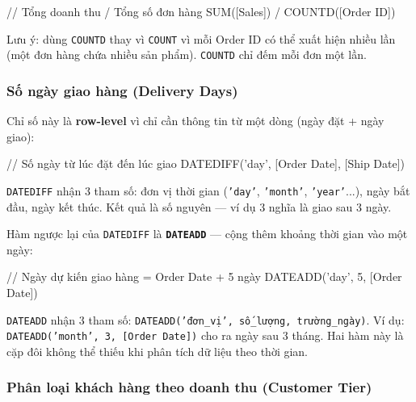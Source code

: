 \documentclass[12pt]{article}
\begin{document}
\begin{aivncodebox}[]
\begin{python}
// Tổng doanh thu / Tổng số đơn hàng
SUM([Sales]) / COUNTD([Order ID])
\end{python}
\end{aivncodebox}

\noindent Lưu ý: dùng \texttt{COUNTD} thay vì \texttt{COUNT} vì mỗi Order ID có thể xuất hiện nhiều lần (một đơn hàng chứa nhiều sản phẩm). \texttt{COUNTD} chỉ đếm mỗi đơn một lần.

\subsubsection{Số ngày giao hàng (Delivery Days)}

\noindent Chỉ số này là \textbf{row-level} vì chỉ cần thông tin từ một dòng (ngày đặt + ngày giao):

\begin{aivncodebox}[]
\begin{python}
// Số ngày từ lúc đặt đến lúc giao
DATEDIFF('day', [Order Date], [Ship Date])
\end{python}
\end{aivncodebox}

\noindent \texttt{DATEDIFF} nhận 3 tham số: đơn vị thời gian (\texttt{'day'}, \texttt{'month'}, \texttt{'year'}...), ngày bắt đầu, ngày kết thúc. Kết quả là số nguyên --- ví dụ 3 nghĩa là giao sau 3 ngày.

\noindent Hàm ngược lại của \texttt{DATEDIFF} là \textbf{\texttt{DATEADD}} --- cộng thêm khoảng thời gian vào một ngày:

\begin{aivncodebox}[]
\begin{python}
// Ngày dự kiến giao hàng = Order Date + 5 ngày
DATEADD('day', 5, [Order Date])
\end{python}
\end{aivncodebox}

\noindent \texttt{DATEADD} nhận 3 tham số: \texttt{DATEADD('đơn\_vị', số\_lượng, trường\_ngày)}. Ví dụ: \texttt{DATEADD('month', 3, [Order Date])} cho ra ngày sau 3 tháng. Hai hàm này là cặp đôi không thể thiếu khi phân tích dữ liệu theo thời gian.

\subsubsection{Phân loại khách hàng theo doanh thu (Customer Tier)}
\end{document}
